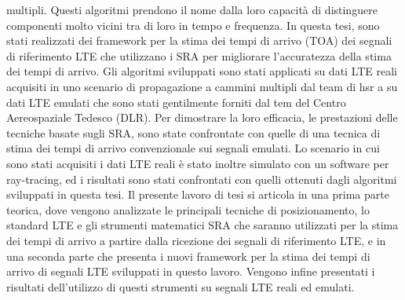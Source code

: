 multipli. Questi algoritmi prendono il nome dalla loro capacit\`a di distinguere componenti molto vicini tra di loro
in tempo e frequenza.
In questa tesi, sono stati realizzati dei framework per la stima dei tempi di 
arrivo (TOA) dei segnali di riferimento LTE che utilizzano i SRA per migliorare l'accuratezza della
stima dei tempi di arrivo. Gli algoritmi sviluppati sono stati applicati su dati LTE reali acquisiti
in uno scenario di propagazione a cammini multipli dal team di \gls{hsr} a su dati LTE emulati che sono stati 
gentilmente forniti dal tem del Centro Aereospaziale Tedesco (DLR).
Per dimostrare la loro efficacia, le prestazioni delle tecniche basate sugli SRA, sono state confrontate
con quelle di una tecnica di stima dei tempi di arrivo convenzionale sui segnali emulati.
Lo scenario in cui sono stati acquisiti i dati LTE reali \`e stato inoltre simulato con un software
per ray-tracing, ed i risultati sono stati confrontati con quelli ottenuti dagli algoritmi sviluppati
in questa tesi.
Il presente lavoro di tesi si articola in una prima parte teorica, dove vengono analizzate le principali tecniche di
posizionamento, lo standard LTE e gli strumenti matematici SRA che saranno 
utilizzati per la stima dei tempi di arrivo a partire dalla ricezione dei segnali di riferimento LTE, e 
in una seconda parte che presenta i nuovi framework per la stima dei tempi di arrivo di segnali LTE sviluppati in 
questo lavoro. Vengono infine presentati i risultati dell'utilizzo di questi strumenti su segnali LTE reali 
ed emulati. 

